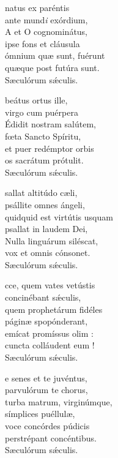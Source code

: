 \documentclass[fontsize=10pt,paper=A5,twoside,BCOR=1mm,DIV=21,headinclude]{scrarticle}
\begin{document}
\begin{paracol}{2}\pcb
\begin{hymnus}
 natus ex paréntis\\
\hspace{1.6em} ante mund\textit{i} exórdium,\\
A et O cognominátus,\\
ipse fons et cláusula\\
ómnium quæ sunt, fuérunt\\
quæque post futúra sunt.\\
Sæculórum s\'æculis.

 beátus ortus ille,\\
virgo cum puérpera\\
Édidit nostram salútem,\\
fœta Sancto Spíritu,\\
et puer redémptor orbis\\
os sacrátum prótulit.\\
Sæculórum s\'æculis.

sallat altitúdo cæli,\\
psállite omnes ángeli,\\
quidquid est virtútis usquam\\
psallat in laudem Dei,\\
Nulla linguárum siléscat,\\
vox et omnis cónsonet.\\
Sæculórum s\'æculis.

cce, quem vates vetústis\\
concinébant s\'æculis,\\
quem prophetárum fidéles\\
páginæ spopónderant,\\
emícat promíssus olim :\\
cuncta colláudent eum !\\
Sæculórum s\'æculis.

e senes et te juvéntus,\\
parvulórum te chorus,\\
turba matrum, virginúmque,\\
símplices puéllulæ,\\
voce concórdes púdicis\\
perstrépant concéntibus.\\
Sæculórum s\'æculis.


\end{hymnus}
\end{paracol}
\end{document}

